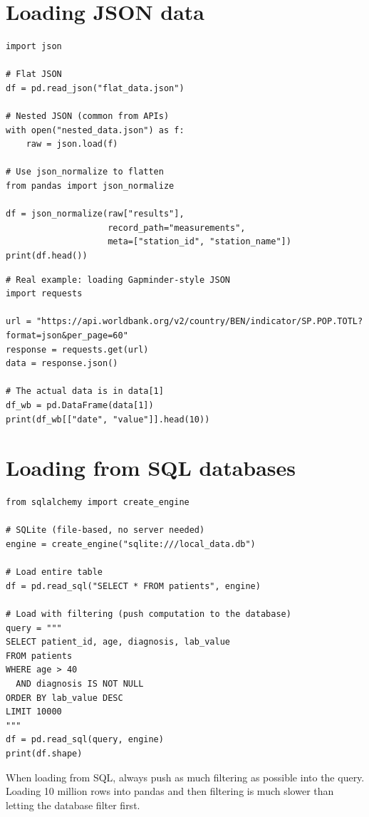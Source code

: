 \section{Loading JSON data}

\begin{verbatim}
import json

# Flat JSON
df = pd.read_json("flat_data.json")

# Nested JSON (common from APIs)
with open("nested_data.json") as f:
    raw = json.load(f)

# Use json_normalize to flatten
from pandas import json_normalize

df = json_normalize(raw["results"],
                    record_path="measurements",
                    meta=["station_id", "station_name"])
print(df.head())
\end{verbatim}

\begin{verbatim}
# Real example: loading Gapminder-style JSON
import requests

url = "https://api.worldbank.org/v2/country/BEN/indicator/SP.POP.TOTL?format=json&per_page=60"
response = requests.get(url)
data = response.json()

# The actual data is in data[1]
df_wb = pd.DataFrame(data[1])
print(df_wb[["date", "value"]].head(10))
\end{verbatim}

\section{Loading from SQL databases}

\begin{verbatim}
from sqlalchemy import create_engine

# SQLite (file-based, no server needed)
engine = create_engine("sqlite:///local_data.db")

# Load entire table
df = pd.read_sql("SELECT * FROM patients", engine)

# Load with filtering (push computation to the database)
query = """
SELECT patient_id, age, diagnosis, lab_value
FROM patients
WHERE age > 40
  AND diagnosis IS NOT NULL
ORDER BY lab_value DESC
LIMIT 10000
"""
df = pd.read_sql(query, engine)
print(df.shape)
\end{verbatim}

\begin{preprocesstip}
When loading from SQL, always push as much filtering as possible into the query. Loading 10 million rows into pandas and then filtering is much slower than letting the database filter first.
\end{preprocesstip}

